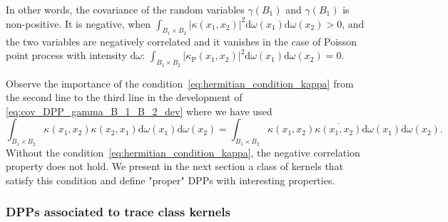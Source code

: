 \documentclass[twoside,11pt]{book}
\numberwithin{theorem}{chapter}
\numberwithin{definition}{chapter}
\numberwithin{proposition}{chapter}
\numberwithin{corollary}{chapter}
\numberwithin{example}{chapter}
\numberwithin{lemma}{chapter}
\numberwithin{assumption}{chapter}
\numberwithin{equation}{chapter}
\numberwithin{figure}{chapter}
\begin{document}
In other words, the covariance of the random variables $\gamma(B_1)$ and $\gamma(B_1)$ is non-positive. It is negative, when $\int_{B_{1} \times B_{2}} |\kappa(x_{1},x_{2})|^{2} \mathrm{d}\omega(x_1) \mathrm{d}\omega(x_2) >0$, and the two variables are negatively correlated and it vanishes in the case of Poisson point process with intensity $\mathrm{d}\omega$: $\int_{B_{1} \times B_{2}} |\kappa_{\mathrm{P}}(x_{1},x_{2})|^{2} \mathrm{d}\omega(x_1) \mathrm{d}\omega(x_2) = 0$.



Observe the importance of the condition~\ref{eq:hermitian_condition_kappa} from the second line to the third line in the development of \eqref{eq:cov_DPP_gamma_B_1_B_2_dev} where we have used
\begin{equation}
\int_{B_{1} \times B_{2}} \kappa(x_{1},x_{2}) \kappa(x_{2},x_{1}) \mathrm{d}\omega(x_{1}) \mathrm{d}\omega(x_{2}) = \int_{B_{1} \times B_{2}} \kappa(x_{1},x_{2}) \overline{\kappa(x_{1},x_{2})} \mathrm{d}\omega(x_{1}) \mathrm{d}\omega(x_{2}).
\end{equation}
Without the condition~\ref{eq:hermitian_condition_kappa}, the negative correlation property does not hold. We present in the next section a class of kernels that satisfy this condition and define "proper" DPPs with interesting properties. 




\subsubsection{DPPs associated to trace class kernels}




\end{document}
